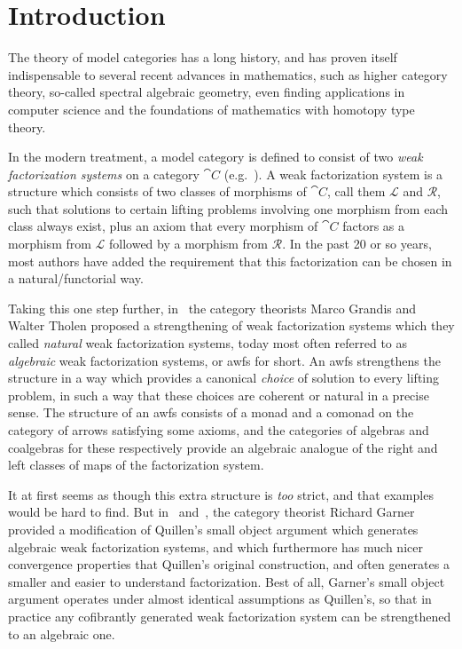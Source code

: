 
\chapter{Introduction}

The theory of model categories has a long history, and has proven itself indispensable to several recent advances in mathematics, such as higher category theory, so-called spectral algebraic geometry, even finding applications in computer science and the foundations of mathematics with homotopy type theory.

In the modern treatment, a model category is defined to consist of two \emph{weak factorization systems} on a category $\cat{C}$ (e.g.~\cite{mp:more-concise}). A weak factorization system is a structure which consists of two classes of morphisms of $\cat{C}$, call them $\mathcal{L}$ and $\mathcal{R}$, such that solutions to certain lifting problems involving one morphism from each class always exist, plus an axiom that every morphism of $\cat{C}$ factors as a morphism from $\mathcal{L}$ followed by a morphism from $\mathcal{R}$. In the past 20 or so years, most authors have added the requirement that this factorization can be chosen in a natural/functorial way.

Taking this one step further, in~\cite{gt:nwfs} the category theorists Marco Grandis and Walter Tholen proposed a strengthening of weak factorization systems which they called \emph{natural} weak factorization systems, today most often referred to as \emph{algebraic} weak factorization systems, or awfs for short. An awfs strengthens the structure in a way which provides a canonical \emph{choice} of solution to every lifting problem, in such a way that these choices are coherent or natural in a precise sense. The structure of an awfs consists of a monad and a comonad on the category of arrows satisfying some axioms, and the categories of algebras and coalgebras for these respectively provide an algebraic analogue of the right and left classes of maps of the factorization system.

It at first seems as though this extra structure is \emph{too} strict, and that examples would be hard to find. But in~\cite{garner:nwfs} and~\cite{garner:soa}, the category theorist Richard Garner provided a modification of Quillen's small object argument which generates algebraic weak factorization systems, and which furthermore has much nicer convergence properties that Quillen's original construction, and often generates a smaller and easier to understand factorization. Best of all, Garner's small object argument operates under almost identical assumptions as Quillen's, so that in practice any cofibrantly generated weak factorization system can be strengthened to an algebraic one.

